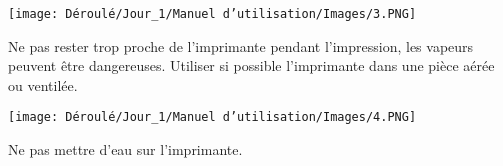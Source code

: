 \begin{multicols}{2}

\texttt{[image: Déroulé/Jour\_1/Manuel d'utilisation/Images/3.PNG]}\\

\columnbreak
\begin{flushleft}
Ne pas rester trop proche de l'imprimante pendant l'impression, les vapeurs peuvent être dangereuses. Utiliser si possible l'imprimante dans une pièce aérée ou ventilée.
\end{flushleft}

\end{multicols}

\begin{multicols}{2}

\texttt{[image: Déroulé/Jour\_1/Manuel d'utilisation/Images/4.PNG]}\\

\columnbreak
\begin{flushleft}
Ne pas mettre d'eau sur l'imprimante.
\end{flushleft}

\end{multicols}